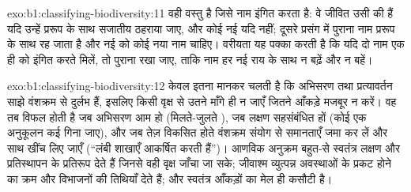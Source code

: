 \begin{solution}{exo:b1:classifying-biodiversity:11}
 वही वस्तु है जिसे नाम इंगित करता है: वे जीवित
 उसी  की हैं यदि उन्हें प्ररूप के साथ सजातीय ठहराया जाए,
और कोई नई  यदि नहीं; दूसरे प्रसंग में पुराना नाम प्ररूप के साथ
रह जाता है और नई  को कोई नया नाम चाहिए। वरीयता
यह पक्का करती है कि यदि दो नाम एक ही  को इंगित करते मिलें, तो
पुराना रखा जाए, ताकि नाम हर नई राय के साथ न बढ़ें और न बहें।
\end{solution}

\begin{solution}{exo:b1:classifying-biodiversity:12}
 केवल इतना मानकर चलती है कि अभिसरण तथा प्रत्यावर्तन साझे
वंशक्रम से दुर्लभ हैं, इसलिए किसी वृक्ष से उतने माँगे ही न जाएँ जितने
आँकड़े मजबूर न करें। वह तब विफल होती है जब अभिसरण आम हो
(मिलते-जुलते ), जब लक्षण सहसंबंधित हों (कोई एक अनुकूलन कई गिना जाए),
और जब तेज़ विकसित होते वंशक्रम संयोग से समानताएँ जमा कर लें और
साथ खींच लिए जाएँ (``लंबी शाखाएँ आकर्षित करती हैं'')।
आणविक अनुक्रम बहुत-से स्वतंत्र लक्षण और प्रतिस्थापन के प्रतिरूप देते हैं
जिनसे वही वृक्ष जाँचा जा सके; जीवाश्म व्युत्पन्न अवस्थाओं के प्रकट होने
का क्रम और विभाजनों की तिथियाँ देते हैं; और स्वतंत्र आँकड़ों का मेल ही
कसौटी है।
\end{solution}

